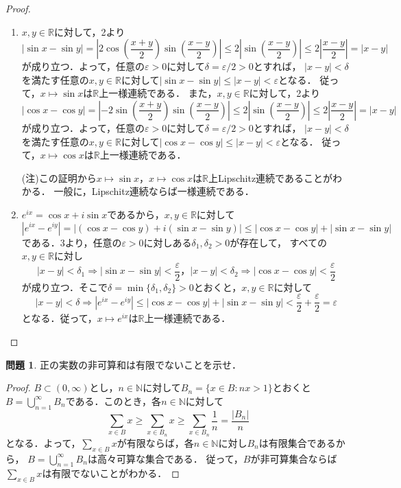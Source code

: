\documentclass{jsarticle}
\theoremstyle{definition}
\newtheorem{qst}{問題}
\begin{document}
\begin{proof}
\begin{enumerate}
\item
$x,y\in\mathbb{R}$に対して，2より
\[
|\sin x-\sin y|=\left|2\cos\left(\frac{x+y}{2}\right)\sin\left(\frac{x-y}{2}\right)\right|
\leq2\left|\sin\left(\frac{x-y}{2}\right)\right|\leq2\left|\frac{x-y}{2}\right|=|x-y|
\]
が成り立つ．よって，任意の$\varepsilon>0$に対して$\delta=\varepsilon/2>0$とすれば，
$|x-y|<\delta$を満たす任意の$x,y\in\mathbb{R}$に対して$|\sin x-\sin y|\leq|x-y|<\varepsilon$となる．
従って，$x\mapsto \sin x$は$\mathbb{R}$上一様連続である．
また，$x,y\in\mathbb{R}$に対して，2より
\[
|\cos x-\cos y|=\left|-2\sin\left(\frac{x+y}{2}\right)\sin\left(\frac{x-y}{2}\right)\right|
\leq2\left|\sin\left(\frac{x-y}{2}\right)\right|\leq2\left|\frac{x-y}{2}\right|=|x-y|
\]
が成り立つ．よって，任意の$\varepsilon>0$に対して$\delta=\varepsilon/2>0$とすれば，
$|x-y|<\delta$を満たす任意の$x,y\in\mathbb{R}$に対して$|\cos x-\cos y|\leq|x-y|<\varepsilon$となる．
従って，$x\mapsto \cos x$は$\mathbb{R}$上一様連続である．

(注)この証明から$x\mapsto \sin x$，$x\mapsto \cos x$は$\mathbb{R}$上Lipschitz連続であることがわかる．
一般に，Lipschitz連続ならば一様連続である．

\item
$e^{ix}=\cos x+i\sin x$であるから，$x,y\in\mathbb{R}$に対して
\[
|e^{ix}-e^{iy}|=|(\cos x-\cos y)+i(\sin x-\sin y)|\leq|\cos x-\cos y|+|\sin x-\sin y|
\]
である．3より，任意の$\varepsilon>0$に対しある$\delta_1,\delta_2>0$が存在して，
すべての$x,y\in\mathbb{R}$に対し
\[
|x-y|<\delta_1\Rightarrow|\sin x-\sin y|<\frac{\varepsilon}{2}，
|x-y|<\delta_2\Rightarrow|\cos x-\cos y|<\frac{\varepsilon}{2}
\]
が成り立つ．そこで$\delta=\min\{\delta_1,\delta_2\}>0$とおくと，$x,y\in\mathbb{R}$に対して
\[
|x-y|<\delta\Rightarrow|e^{ix}-e^{iy}|\leq|\cos x-\cos y|+|\sin x-\sin y|
<\frac{\varepsilon}{2}+\frac{\varepsilon}{2}=\varepsilon
\]
となる．従って，$x\mapsto e^{ix}$は$\mathbb{R}$上一様連続である．
\end{enumerate}
\end{proof}

\begin{qst}
正の実数の非可算和は有限でないことを示せ．
\end{qst}
\begin{proof}
$B\subset(0,\infty)$とし，$n\in\mathbb{N}$に対して$B_n=\{x\in B:nx>1\}$とおくと
$B=\bigcup_{n=1}^\infty B_n$である．このとき，各$n\in\mathbb{N}$に対して
\[ \sum_{x\in B}x\geq\sum_{x\in B_n}x\geq\sum_{x\in B_n}\frac{1}{n}=\frac{|B_n|}{n} \]
となる．よって，$\sum_{x\in B}x$が有限ならば，各$n\in\mathbb{N}$に対し$B_n$は有限集合であるから，
$B=\bigcup_{n=1}^\infty B_n$は高々可算な集合である．
従って，$B$が非可算集合ならば$\sum_{x\in B}x$は有限でないことがわかる．
\end{proof}
\end{document}

